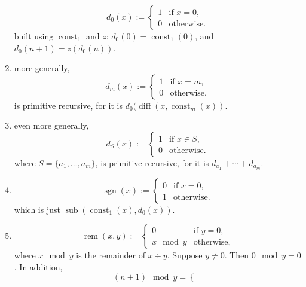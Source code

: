 \documentclass[12pt]{article}
\begin{document}
\begin{enumerate}
\begin{displaymath}
d_0(x):= \left\{
\begin{array}{ll}
1 & \textrm{if } x =0, \\
0 & \textrm{otherwise.}
\end{array}
\right.
\end{displaymath}
built using $\operatorname{const}_1$ and $z$: $d_0(0)=\operatorname{const}_1(0)$, and $d_0(n+1)=z(d_0(n))$.
\item more generally,
\begin{displaymath}
d_m(x):= \left\{
\begin{array}{ll}
1 & \textrm{if } x =m, \\
0 & \textrm{otherwise.}
\end{array}
\right.
\end{displaymath}
is primitive recursive, for it is $d_0(\operatorname{diff}(x,\operatorname{const}_m(x))$.
\item even more generally,
\begin{displaymath}
d_S(x):= \left\{
\begin{array}{ll}
1 & \textrm{if } x\in S, \\
0 & \textrm{otherwise.}
\end{array}
\right.
\end{displaymath}
where $S=\lbrace a_1,\ldots,a_m\rbrace$, is primitive recursive, for it is $d_{a_1}+\cdots +d_{a_m}$.
\item
\begin{displaymath}
\operatorname{sgn}(x):= \left\{
\begin{array}{ll}
0 & \textrm{if } x =0, \\
1 & \textrm{otherwise.}
\end{array}
\right.
\end{displaymath}
which is just $\operatorname{sub}(\operatorname{const}_1(x),d_0(x))$.
\item 
\begin{displaymath}
\operatorname{rem}(x,y):= \left\{
\begin{array}{ll}
0 & \textrm{if } y=0, \\
x\!\!\!\!\!\mod\! y & \textrm{otherwise,}
\end{array}
\right.
\end{displaymath}
where $x\!\!\!\mod\! y$ is the remainder of $x\div y$.  Suppose $y\ne 0$.  Then $0\!\!\!\mod\! y=0$.  In addition, 
\begin{displaymath}
(n+1)\!\!\!\!\mod\! y= \left\{
\begin{array}{ll}

\end{array}
\end{displaymath}
\end{enumerate}
\end{document}
